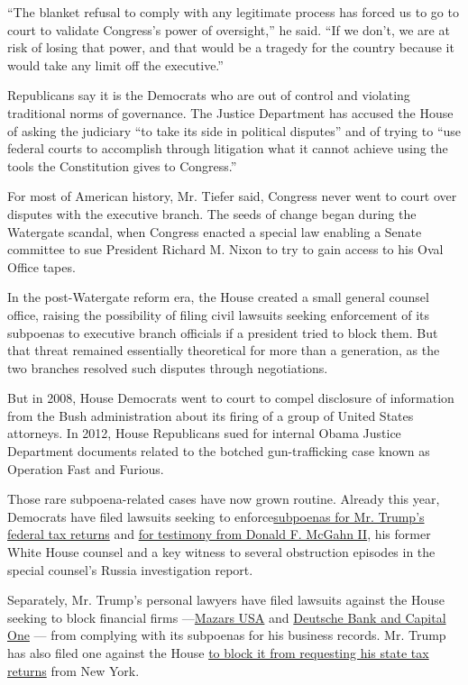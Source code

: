``The blanket refusal to comply with any legitimate process has forced
us to go to court to validate Congress's power of oversight,'' he said.
``If we don't, we are at risk of losing that power, and that would be a
tragedy for the country because it would take any limit off the
executive.''

Republicans say it is the Democrats who are out of control and violating
traditional norms of governance. The Justice Department has accused the
House of asking the judiciary ``to take its side in political disputes''
and of trying to ``use federal courts to accomplish through litigation
what it cannot achieve using the tools the Constitution gives to
Congress.''

For most of American history, Mr. Tiefer said, Congress never went to
court over disputes with the executive branch. The seeds of change began
during the Watergate scandal, when Congress enacted a special law
enabling a Senate committee to sue President Richard M. Nixon to try to
gain access to his Oval Office tapes.

In the post-Watergate reform era, the House created a small general
counsel office, raising the possibility of filing civil lawsuits seeking
enforcement of its subpoenas to executive branch officials if a
president tried to block them. But that threat remained essentially
theoretical for more than a generation, as the two branches resolved
such disputes through negotiations.

But in 2008, House Democrats went to court to compel disclosure of
information from the Bush administration about its firing of a group of
United States attorneys. In 2012, House Republicans sued for internal
Obama Justice Department documents related to the botched
gun-trafficking case known as Operation Fast and Furious.

Those rare subpoena-related cases have now grown routine. Already this
year, Democrats have filed lawsuits seeking to
enforce\href{https://www.nytimes3xbfgragh.onion/2019/07/02/us/politics/trump-taxes-lawsuit.html}{subpoenas
for Mr. Trump's federal tax returns} and
\href{https://www.nytimes3xbfgragh.onion/2019/08/07/us/politics/don-mcgahn-subpoena.html}{for
testimony from Donald F. McGahn II}, his former White House counsel and
a key witness to several obstruction episodes in the special counsel's
Russia investigation report.

Separately, Mr. Trump's personal lawyers have filed lawsuits against the
House seeking to block financial firms
---\href{https://www.nytimes3xbfgragh.onion/2019/04/22/us/politics/trump-sues-congress.htmlhttps://www.nytimes3xbfgragh.onion/2019/04/22/us/politics/trump-sues-congress.html}{}\href{https://www.nytimes3xbfgragh.onion/2019/04/22/us/politics/trump-sues-congress.html}{Mazars
USA} and
\href{https://www.nytimes3xbfgragh.onion/2019/04/29/us/politics/trump-lawsuit-deutsche-bank.html}{Deutsche
Bank and Capital One} --- from complying with its subpoenas for his
business records. Mr. Trump has also filed one against the House
\href{https://www.nytimes3xbfgragh.onion/2019/07/23/us/politics/trump-tax-returns-new-york.html}{to
block it from requesting his state tax returns} from New York.

